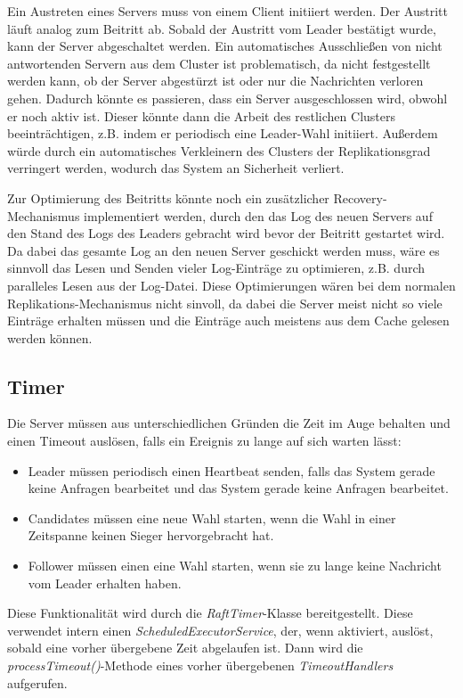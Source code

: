 Ein Austreten eines Servers muss von einem Client initiiert werden. Der Austritt läuft analog zum Beitritt ab. Sobald der Austritt vom Leader bestätigt wurde, kann der Server abgeschaltet werden. Ein automatisches Ausschließen von nicht antwortenden Servern aus dem Cluster ist problematisch, da nicht festgestellt werden kann, ob der Server abgestürzt ist oder nur die Nachrichten verloren gehen. Dadurch könnte es passieren, dass ein Server ausgeschlossen wird, obwohl er noch aktiv ist. Dieser könnte dann die Arbeit des restlichen Clusters beeinträchtigen, z.B. indem er periodisch eine Leader-Wahl initiiert. Außerdem würde durch ein automatisches Verkleinern des Clusters der Replikationsgrad verringert werden, wodurch das System an Sicherheit verliert.

Zur Optimierung des Beitritts könnte noch ein zusätzlicher \glqq Recovery\grqq-Mechanismus implementiert werden, durch den das Log des neuen Servers auf den Stand des Logs des Leaders gebracht wird bevor der Beitritt gestartet wird. Da dabei das gesamte Log an den neuen Server geschickt werden muss, wäre es sinnvoll das Lesen und Senden vieler Log-Einträge zu optimieren, z.B. durch paralleles Lesen aus der Log-Datei. Diese Optimierungen wären bei dem normalen Replikations-Mechanismus nicht sinvoll, da dabei die Server meist nicht so viele Einträge erhalten müssen und die Einträge auch meistens aus dem Cache gelesen werden können.

\subsection{Timer}

Die Server müssen aus unterschiedlichen Gründen die Zeit im Auge behalten und einen Timeout auslösen, falls ein Ereignis zu lange auf sich warten lässt:

\begin{itemize}
	\item Leader müssen periodisch einen Heartbeat senden, falls das System gerade keine Anfragen bearbeitet und das System gerade keine Anfragen bearbeitet.
	\item Candidates müssen eine neue Wahl starten, wenn die Wahl in einer Zeitspanne keinen Sieger hervorgebracht hat.
	\item Follower müssen einen eine Wahl starten, wenn sie zu lange keine Nachricht vom Leader erhalten haben.
\end{itemize}

Diese Funktionalität wird durch die \textit{RaftTimer}-Klasse bereitgestellt. Diese verwendet intern einen \textit{ScheduledExecutorService}, der, wenn aktiviert, auslöst, sobald eine vorher übergebene Zeit abgelaufen ist. Dann wird die \textit{processTimeout()}-Methode eines vorher übergebenen \textit{TimeoutHandlers} aufgerufen. 

